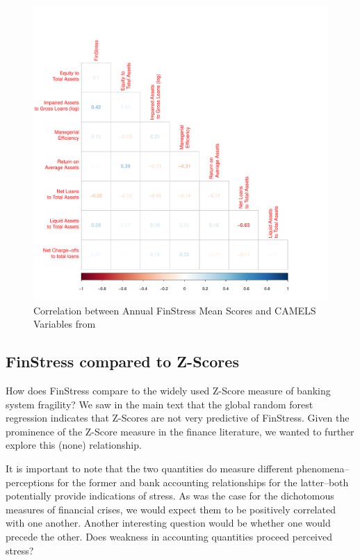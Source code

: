 \documentclass[]{article}
\begin{document}
\begin{figure}[H]
	\caption{Correlation between Annual FinStress Mean Scores and CAMELS Variables from \cite{Andrianova2015}}
    \label{cor_camel}
    \begin{center}
    	\includegraphics[scale=0.5]{figures/ff_corr_matrix.pdf}
    \end{center}
\end{figure}

\subsection*{FinStress compared to Z-Scores}

How does FinStress compare to the widely used Z-Score measure of banking system fragility? We saw in the main text that the global random forest regression indicates that Z-Scores are not very predictive of FinStress. Given the prominence of the Z-Score measure in the finance literature, we wanted to further explore this (none) relationship.

It is important to note that the two quantities do measure different phenomena--perceptions for the former and bank accounting relationships for the latter--both potentially  provide indications of stress. As was the case for the dichotomous measures of financial crises, we would expect them to be positively correlated with one another. Another interesting question would be whether one would precede the other. Does weakness in accounting quantities proceed perceived stress?
\end{document}
